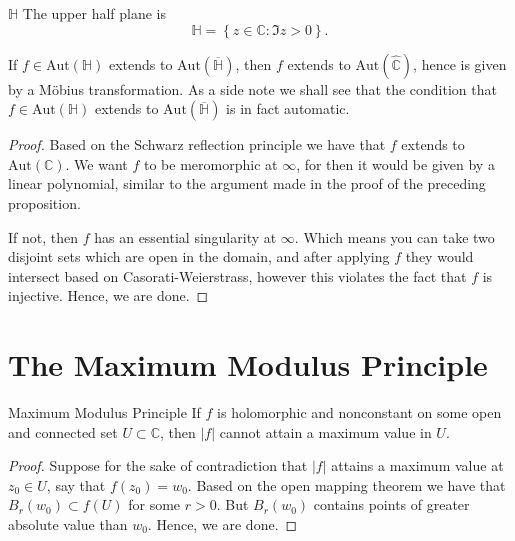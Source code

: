 \documentclass{article}
\begin{document}
\begin{defn}{\( \mathbb{H}  \) }{}
    The upper half plane is 
    \[
        \mathbb{H} = \left\{ z \in \mathbb{C} : \Im z>0 \right\}. 
    \]

\end{defn}

\begin{lem}{}{}
If \( f \in  \mathrm{Aut(\mathbb{H} )}  \) extends to \( \mathrm{Aut}(\overline{\mathbb{H}}  ) \), then \( f \) extends  to \( \mathrm{Aut}(\hat{\mathbb{C}}  )  \), hence is given by a Möbius transformation. 
As a side note we shall see that the condition that \( f \in  \mathrm{Aut(\mathbb{H} )}  \) extends to \( \mathrm{Aut}(\overline{\mathbb{H}}  ) \) is in fact automatic.
\tcbline
\begin{proof}
Based on the Schwarz reflection principle we have that \( f \) extends to \( \mathrm{Aut}(\mathbb{C} ) \). We want \( f \) to be meromorphic at \( \infty  \), for then it would be given by a linear polynomial, similar to the argument made in the proof of the preceding proposition.  

If not, then \( f \) has an essential singularity at \( \infty  \). Which means you can take two disjoint sets which are open in the domain, and after applying \( f \) they would intersect based on Casorati-Weierstrass, however this violates the fact that \( f \) is injective. Hence, we are done. 
\end{proof}

\end{lem}


\section{The Maximum Modulus Principle}

\begin{thrm}{Maximum Modulus Principle}{}
    If \( f \) is holomorphic and nonconstant on some open and connected set \( U \subset \mathbb{C}  \), then \( |f| \) cannot attain a maximum value in \( U \). 
    \tcbline
    \begin{proof}
    Suppose for the sake of contradiction that \( |f| \) attains a maximum value at \( z_0 \in U\), say that \( f(z_0) = w_0 \). Based on the open mapping theorem we have that \( B_r(w_0) \subset f(U) \) for some \( r > 0 \). But \( B_{r} (w_0) \) contains points of greater absolute value than \( w_0 \). Hence, we are done. 
    \end{proof}
    
\end{thrm}
\end{document}
